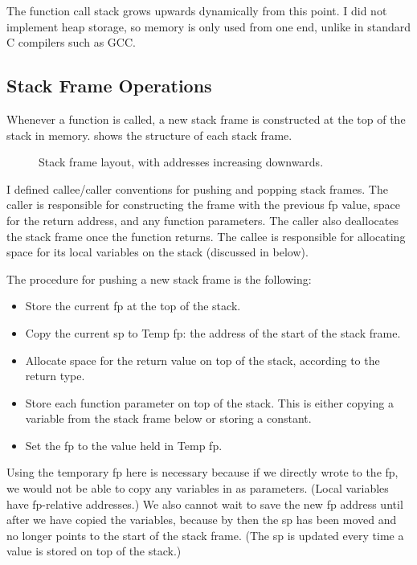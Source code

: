 \documentclass[00-main.tex]{subfiles}
\begin{document}
The function call stack grows upwards dynamically from this point.
I did not implement heap storage, so memory is only used from one end, unlike in standard C compilers such as GCC\@.

\subsection{Stack Frame Operations}

Whenever a function is called, a new stack frame is constructed at the top of the stack in memory.
 shows the structure of each stack frame.

\begin{figure}[ht]
  \centering
  \caption{Stack frame layout, with addresses increasing downwards.}
  \label{fig:stack frame layout} %
\end{figure}

I defined callee/caller conventions for pushing and popping stack frames.
The caller is responsible for constructing the frame with the previous \gls{fp} value, space for the return address, and any function parameters.
The caller also deallocates the stack frame once the function returns.
The callee is responsible for allocating space for its local variables on the stack (discussed in  below).

The procedure for pushing a new stack frame is the following:

\begin{itemize}[nosep]
\item
Store the current \gls{fp} at the top of the stack.
\item
Copy the current \gls{sp} to Temp \gls{fp}: the address of the start of the stack frame.
\item
Allocate space for the return value on top of the stack, according to the return type.
\item
Store each function parameter on top of the stack.
This is either copying a variable from the stack frame below or storing a constant.
\item
Set the \gls{fp} to the value held in Temp \gls{fp}.
\end{itemize}

Using the temporary \gls{fp} here is necessary because if we directly wrote to the \gls{fp}, we would not be able to copy any variables in as parameters.
(Local variables have \gls{fp}-relative addresses.)
We also cannot wait to save the new \gls{fp} address until after we have copied the variables, because by then the \gls{sp} has been moved and no longer points to the start of the stack frame.
(The \gls{sp} is updated every time a value is stored on top of the stack.)
\end{document}
